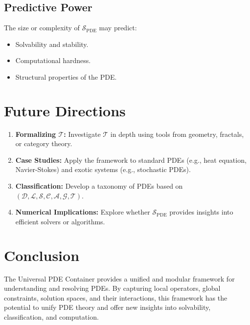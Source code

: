 \documentclass[12pt]{article}
\begin{document}
\subsection{Predictive Power}
The size or complexity of \(\mathcal{S}_{\text{PDE}}\) may predict:
\begin{itemize}
    \item Solvability and stability.
    \item Computational hardness.
    \item Structural properties of the PDE.
\end{itemize}

\section{Future Directions}
\begin{enumerate}
    \item \textbf{Formalizing \(\mathcal{T}\):} Investigate \(\mathcal{T}\) in depth using tools from geometry, fractals, or category theory.
    \item \textbf{Case Studies:} Apply the framework to standard PDEs (e.g., heat equation, Navier-Stokes) and exotic systems (e.g., stochastic PDEs).
    \item \textbf{Classification:} Develop a taxonomy of PDEs based on \((\mathcal{D}, \mathcal{L}, \mathcal{S}, \mathcal{C}, \mathcal{A}, \mathcal{G}, \mathcal{T})\).
    \item \textbf{Numerical Implications:} Explore whether \(\mathcal{S}_{\text{PDE}}\) provides insights into efficient solvers or algorithms.
\end{enumerate}

\section{Conclusion}
The Universal PDE Container provides a unified and modular framework for understanding and resolving PDEs. By capturing local operators, global constraints, solution spaces, and their interactions, this framework has the potential to unify PDE theory and offer new insights into solvability, classification, and computation.
\end{document}
